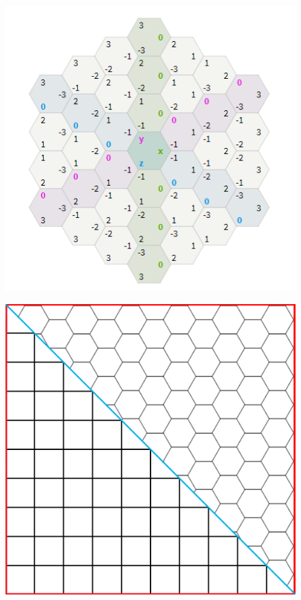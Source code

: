 \begin{figure}[h]
\centering
\includegraphics[scale=0.7]{kepek/image16.png}
\caption{}
\label{fig:image16}
\end{figure}

\begin{figure}[h]
\centering
\includegraphics[scale=0.2]{kepek/image22.png}
\caption{}
\label{fig:image22}
\end{figure}

